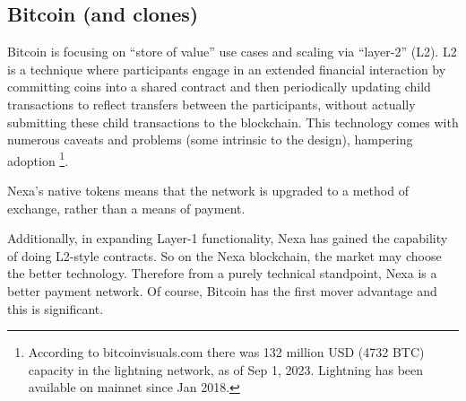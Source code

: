 \documentclass[a4paper, 11pt]{article}
\begin{document}
\subsection{Bitcoin (and clones)}
Bitcoin is focusing on “store of value” use cases and scaling via “layer-2” (L2).  L2 is a technique where participants engage in an extended financial interaction by committing coins into a shared contract and then periodically updating child transactions to reflect transfers between the participants, without actually submitting these child transactions to the blockchain.  This technology comes with numerous caveats and problems (some intrinsic to the design), hampering adoption \footnote{According to bitcoinvisuals.com there was 132 million USD (4732 BTC) capacity in the lightning network, as of Sep 1, 2023.  Lightning has been available on mainnet since Jan 2018.
}.

 	 Nexa’s native tokens means that the network is upgraded to a method of exchange, rather than a means of payment.

Additionally, in expanding Layer-1 functionality, Nexa has gained the capability of doing L2-style contracts.  So on the Nexa blockchain, the market may choose the better technology.  Therefore from a purely technical standpoint, Nexa is a better payment network.  Of course, Bitcoin has the first mover advantage and this is significant.
\end{document}
